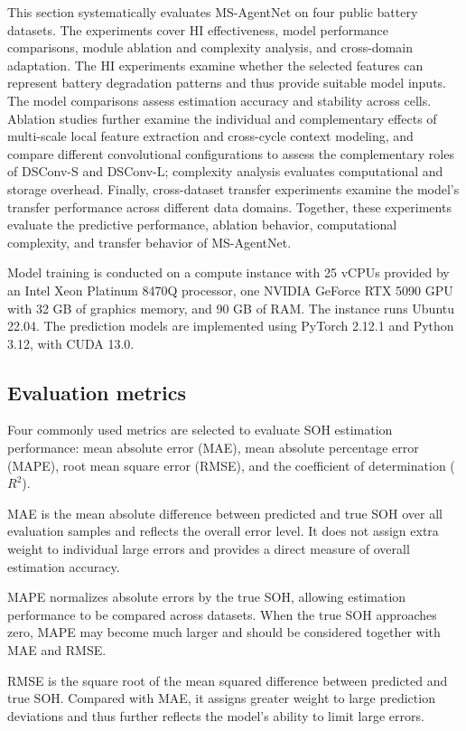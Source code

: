 This section systematically evaluates MS-AgentNet on four public battery datasets. The experiments cover HI effectiveness, model performance comparisons, module ablation and complexity analysis, and cross-domain adaptation. The HI experiments examine whether the selected features can represent battery degradation patterns and thus provide suitable model inputs. The model comparisons assess estimation accuracy and stability across cells. Ablation studies further examine the individual and complementary effects of multi-scale local feature extraction and cross-cycle context modeling, and compare different convolutional configurations to assess the complementary roles of DSConv-S and DSConv-L; complexity analysis evaluates computational and storage overhead. Finally, cross-dataset transfer experiments examine the model's transfer performance across different data domains. Together, these experiments evaluate the predictive performance, ablation behavior, computational complexity, and transfer behavior of MS-AgentNet.

Model training is conducted on a compute instance with 25 vCPUs provided by an Intel Xeon Platinum 8470Q processor, one NVIDIA GeForce RTX 5090 GPU with 32 GB of graphics memory, and 90 GB of RAM. The instance runs Ubuntu 22.04. The prediction models are implemented using PyTorch 2.12.1 and Python 3.12, with CUDA 13.0.

\subsection{Evaluation metrics}

Four commonly used metrics are selected to evaluate SOH estimation performance: mean absolute error (MAE), mean absolute percentage error (MAPE), root mean square error (RMSE), and the coefficient of determination ($R^2$)\cite{ref76}.

MAE is the mean absolute difference between predicted and true SOH over all evaluation samples and reflects the overall error level. It does not assign extra weight to individual large errors and provides a direct measure of overall estimation accuracy.

MAPE normalizes absolute errors by the true SOH, allowing estimation performance to be compared across datasets. When the true SOH approaches zero, MAPE may become much larger and should be considered together with MAE and RMSE.

RMSE is the square root of the mean squared difference between predicted and true SOH. Compared with MAE, it assigns greater weight to large prediction deviations and thus further reflects the model's ability to limit large errors.


